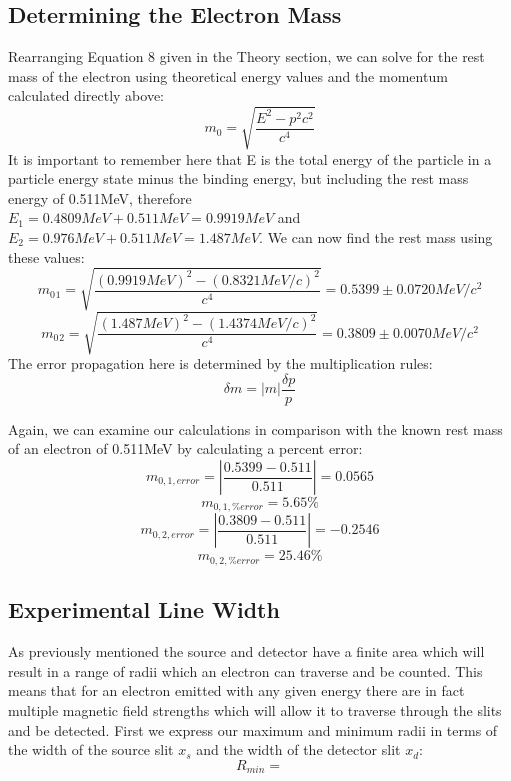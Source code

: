 \subsection{Determining the Electron Mass}
Rearranging Equation 8 given in the Theory section, we can solve for the rest mass of the electron using theoretical energy values and the momentum calculated directly above:
\begin{equation} m_0=\sqrt{\frac{E^2-p^2c^2}{c^4}}\end{equation}
It is important to remember here that E is the total energy of the particle in a particle energy state minus the binding energy, but including the rest mass energy of 0.511MeV, therefore \\$E_1=0.4809MeV+0.511MeV=0.9919MeV$ and $E_2=0.976MeV+0.511MeV=1.487MeV$. We can now find the rest mass using these values:
\begin{equation} m_0{_1}=\sqrt{\frac{(0.9919MeV)^2-(0.8321MeV/c)^2}{c^4}}=0.5399\pm0.0720 MeV/c^2\end{equation}
\begin{equation} m_0{_2}=\sqrt{\frac{(1.487MeV)^2-(1.4374MeV/c)^2}{c^4}}=0.3809\pm0.0070 MeV/c^2\end{equation}
The error propagation here is determined by the multiplication rules:
\begin{equation} \delta m= |m|\frac{\delta p}{p} \end {equation}

Again, we can examine our calculations in comparison with the known rest mass of an electron of 0.511MeV by calculating a percent error:
\begin{equation} m_{0,1,error}=|\frac{0.5399-0.511}{0.511}|=0.0565\end{equation}
\begin{equation} m_{0,1,\%error}=5.65\%\end{equation}
\begin{equation} m_{0,2,error}=|\frac{0.3809-0.511}{0.511}|=-0.2546\end{equation}
\begin{equation} m_{0,2,\%error}=25.46\%\end{equation}
\subsection{Experimental Line Width}
As previously mentioned the source and detector have a finite area which will result in a range of radii which an electron can traverse and be counted. This means that for an electron emitted with any given energy there are in fact multiple magnetic field strengths which will allow it to traverse through the slits and be detected. First we express our maximum and minimum radii in terms of the width of the source slit $x_s$ and the width of the detector slit $x_d$:
\begin{equation}
R_{min} =
\end{equation}  

